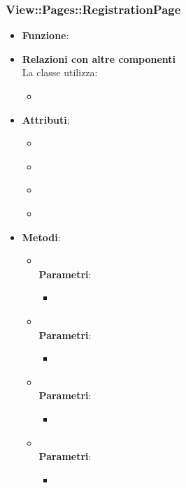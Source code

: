 \subsubsection{View::Pages::RegistrationPage}
\begin{itemize}
\item\textbf{Funzione}:
\item\textbf{Relazioni con altre componenti}\\
La classe utilizza:
	\begin{itemize}
		\item
	\end{itemize}
\item\textbf{Attributi}:
	\begin{itemize}
		\item\code{}\\
		\item\code{}\\
		\item\code{}\\
		\item\code{}\\
	\end{itemize}
\item\textbf{Metodi}:
	\begin{itemize}
		\item\code{}\\
		\textbf{Parametri}:
			\begin{itemize}
				\item\code{}\\
			\end{itemize}
		\item\code{}\\
		\textbf{Parametri}:
			\begin{itemize}
				\item\code{}\\
			\end{itemize}
		\item\code{}\\
		\textbf{Parametri}:
			\begin{itemize}
				\item\code{}\\
			\end{itemize}
		\item\code{}\\
		\textbf{Parametri}:
			\begin{itemize}
				\item\code{}\\
			\end{itemize}
	\end{itemize}
\end{itemize}

